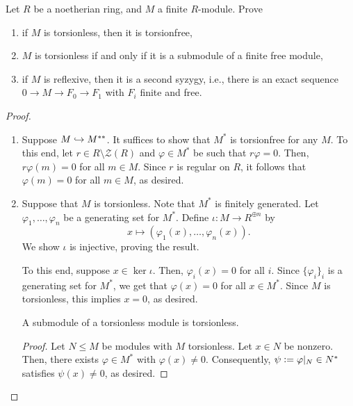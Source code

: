 \documentclass[12pt]{article}
\begin{document}
\begin{exe} \label{exe:noetherian-torsion-reflexive-implications}
	Let $R$ be a noetherian ring, and $M$ a finite $R$-module. Prove
	\begin{enumerate}[label=(\alph*)]
		\item if $M$ is torsionless, then it is torsionfree,
		\item $M$ is torsionless if and only if it is a submodule of a finite free module,
		\item if $M$ is reflexive, then it is a second syzygy, i.e., there is an exact sequence $0 \to M \to F_{0} \to F_{1}$ with $F_{i}$ finite and free.
	\end{enumerate}
\end{exe}
\begin{proof} 
	\phantom{h}
	\begin{enumerate}[label=(\alph*)]
		\item Suppose $M \hookrightarrow M^{\ast \ast}$. It suffices to show that $M^{\ast}$ is torsionfree for any $M$. \newline
		To this end, let $r \in R \setminus \mathcal{Z}(R)$ and $\varphi \in M^{\ast}$ be such that $r \varphi = 0$. Then, $r \varphi(m) = 0$ for all $m \in M$. Since $r$ is regular on $R$, it follows that $\varphi(m) = 0$ for all $m \in M$, as desired.
		\item \forward Suppose that $M$ is torsionless. Note that $M^{\ast}$ is finitely generated. Let $\varphi_{1}, \ldots, \varphi_{n}$ be a generating set for $M^{\ast}$. Define $\iota : M \to R^{\oplus n}$ by
		\begin{equation*} 
			x \mapsto (\varphi_{1}(x), \ldots, \varphi_{n}(x)).
		\end{equation*}
		We show $\iota$ is injective, proving the result. 

		To this end, suppose $x \in \ker \iota$. Then, $\varphi_{i}(x) = 0$ for all $i$. Since $\{\varphi_{i}\}_{i}$ is a generating set for $M^{\ast}$, we get that $\varphi(x) = 0$ for all $x \in M^{\ast}$. Since $M$ is torsionless, this implies $x = 0$, as desired.

		\backward {} A submodule of a torsionless module is torsionless.
		\begin{proof} 
			Let $N \le M$ be modules with $M$ torsionless. Let $x \in N$ be nonzero. Then, there exists $\varphi \in M^{\ast}$ with $\varphi(x) \neq 0$. Consequently, $\psi \vcentcolon= \varphi|_{N} \in N^{\ast}$ satisfies $\psi(x) \neq 0$, as desired.
		\end{proof}


\end{enumerate}
\end{proof}
\end{document}
